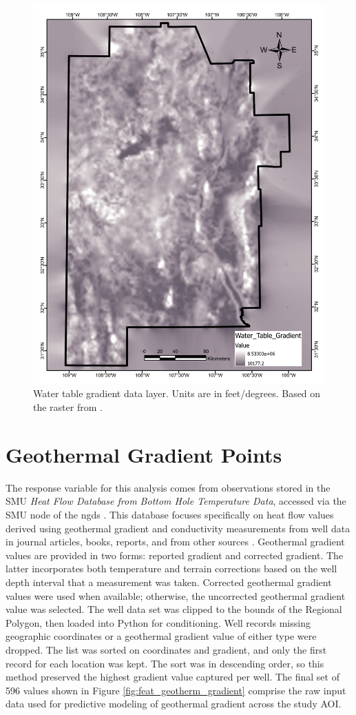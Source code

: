 \begin{figure}[H]
\centering
\includegraphics[width=0.75\linewidth]{templates/images/Figure-WTGradient.pdf}
\caption[Water table gradient data layer]{Water table gradient data layer. Units are in feet/degrees. Based on the raster from \protect\citet{bielicki_hydrogeolgic_2015}.}
\label{fig:feat_wt_gradient}
\end{figure}
\pagebreak

\section{Geothermal Gradient Points}\label{app:pts_geothermal_gradient}
The response variable for this analysis comes from observations stored in the SMU \textit{Heat Flow Database from Bottom Hole Temperature Data}, accessed via the SMU node of the \acrlong{ngds} \citep{smu_geothermal_2021}. This database focuses specifically on heat flow values derived using geothermal gradient and conductivity measurements from well data in journal articles, books, reports, and from other sources \citep{blackwell_geothermal_2014}. Geothermal gradient values are provided in two forms: reported gradient and corrected gradient. The latter incorporates both temperature and terrain corrections based on the well depth interval that a measurement was taken. Corrected geothermal gradient values were used when available; otherwise, the uncorrected geothermal gradient value was selected. The well data set was clipped to the bounds of the Regional Polygon, then loaded into Python for conditioning. Well records missing geographic coordinates or a geothermal gradient value of either type were dropped. The list was sorted on coordinates and gradient, and only the first record for each location was kept. The sort was in descending order, so this method preserved the highest gradient value captured per well. The final set of 596 values shown in Figure \ref{fig:feat_geotherm_gradient} comprise the raw input data used for predictive modeling of geothermal gradient across the study AOI.
\vfill
\pagebreak

